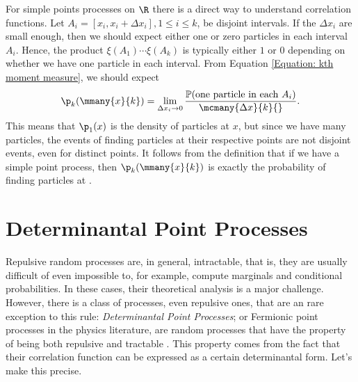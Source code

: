 For simple points processes on $\R$ there is a direct way to understand correlation functions. Let $A_i = [x_i, x_i + \Delta x_i], 1 \leq i \leq k$, be disjoint intervals. If the $\Delta x_i$ are small enough, then we should expect either one or zero particles in each interval $A_i$. Hence, the product $\xi(A_1) \cdots \xi(A_k)$ is typically either $1$ or $0$ depending on whether we have one particle in each interval. From Equation \ref{Equation: kth moment measure}, we should expect
\begin{equation}
	\p_k(\mmany{x}{k}) = \lim_{\Delta x_i \rightarrow 0} \frac{\mathbb{P}(\text{one particle in each} \ A_i)}{\mcmany{\Delta x}{k}{}}.
\end{equation}
This means that $\p_1(x)$ is the density of particles at $x$, but since we have many particles, the events of finding particles at their respective points are not disjoint events, even for distinct points. It follows from the definition that if we have a simple point process, then $\p_k(\mmany{x}{k})$ is exactly the probability of finding particles at .


\section{Determinantal Point Processes}

Repulsive random processes are, in general, intractable, that is, they are usually difficult of even impossible to, for example, compute marginals and conditional probabilities. In these cases, their theoretical analysis is a major challenge. However, there is a class of processes, even repulsive ones, that are an rare exception to this rule: \textit{Determinantal Point Processes}; or Fermionic point processes in the physics literature, are random processes that have the property of being both repulsive and tractable \cite{Tremblay}. This property comes from the fact that their correlation function can be expressed as a certain determinantal form. Let's make this precise.

